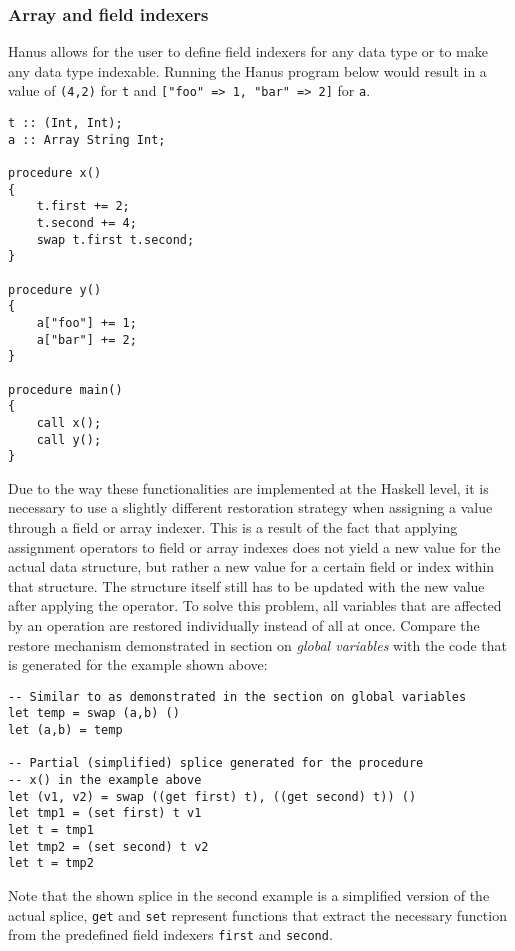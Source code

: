 \documentclass[12pt,a4paper]{article}
\begin{document}
\subsubsection{Array and field indexers}
Hanus allows for the user to define field indexers for any data type or to make any data type indexable. Running the Hanus program below would result in a value of \texttt{(4,2)} for \texttt{t} and \texttt{["foo" => 1, "bar" => 2]} for \texttt{a}. 
\begin{verbatim}
t :: (Int, Int);
a :: Array String Int;

procedure x()
{
    t.first += 2;
    t.second += 4;
    swap t.first t.second;
}

procedure y()
{
    a["foo"] += 1;
    a["bar"] += 2;
}

procedure main()
{
    call x();
    call y();
}
\end{verbatim}

Due to the way these functionalities are implemented at the Haskell level, it is necessary to use a slightly different restoration strategy when assigning a value through a field or array indexer. This is a result of the fact that applying assignment operators to field or array indexes does not yield a new value for the actual data structure, but rather a new value for a certain field or index within that structure. The structure itself still has to be updated with the new value after applying the operator. To solve this problem, all variables that are affected by an operation are restored individually instead of all at once. Compare the restore mechanism demonstrated in section on \emph{global variables} with the code that is generated for the example shown above:

\begin{verbatim}
-- Similar to as demonstrated in the section on global variables
let temp = swap (a,b) ()
let (a,b) = temp

-- Partial (simplified) splice generated for the procedure 
-- x() in the example above
let (v1, v2) = swap ((get first) t), ((get second) t)) ()
let tmp1 = (set first) t v1
let t = tmp1
let tmp2 = (set second) t v2
let t = tmp2
\end{verbatim}

Note that the shown splice in the second example is a simplified version of the actual splice, \texttt{get} and \texttt{set} represent functions that extract the necessary function from the predefined field indexers \texttt{first} and \texttt{second}. 
\end{document}
